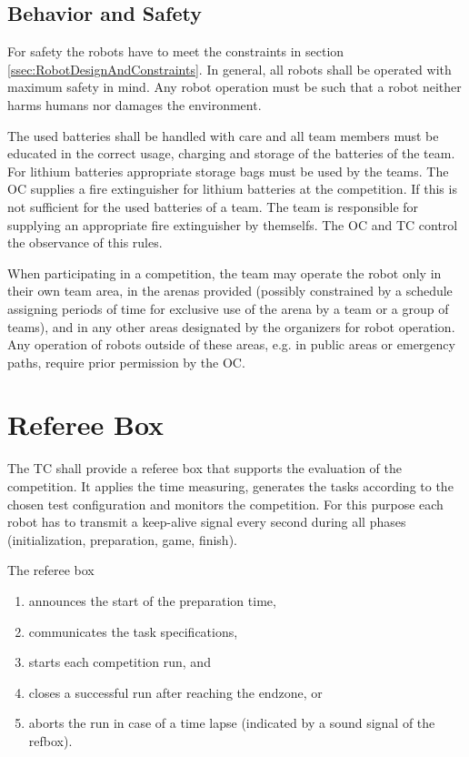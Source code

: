 \subsection{Behavior and Safety} \label{ssec:RobotBehaviorAndSafety}
For safety the robots have to meet the constraints in section \ref{ssec:RobotDesignAndConstraints}. In general, all robots shall be operated with maximum safety in mind. Any robot operation must be such that a robot neither harms humans nor damages the environment. \par 
The used batteries shall be handled with care and all team members must be educated in the correct usage, charging and storage of the batteries of the team. For lithium batteries appropriate storage bags must be used by the teams. The OC supplies a fire extinguisher for lithium batteries at the competition. If this is not sufficient for the used batteries of a team. The team is responsible for supplying an appropriate fire extinguisher by themselfs. The OC and TC control the observance of this rules.

When participating in a competition, the team may operate the robot only in their own team area, in the arenas provided (possibly constrained by a schedule assigning periods of time for exclusive use of the arena by a team or a group of teams), and in any other areas designated by the organizers for robot operation. Any operation of robots outside of these areas, e.g. in public areas or emergency paths, require prior permission by the OC.

\section{Referee Box}
\label{sec:refbox}
The TC shall provide a referee box that supports the evaluation of the competition. It applies the time measuring, generates the tasks according to the chosen test configuration and monitors the
competition. For this purpose each robot has to transmit a keep-alive signal every second during all phases (initialization, preparation, game, finish).

The referee box
\begin{enumerate}
  \item announces the start of the preparation time,
  \item communicates the task specifications,
  \item starts each competition run, and
  \item closes a successful run after reaching the endzone, or
  \item aborts the run in case of a time lapse (indicated by a sound signal of the refbox).
\end{enumerate}

